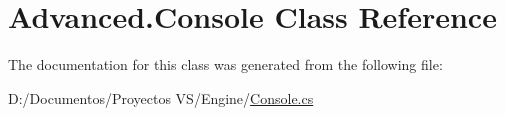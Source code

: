 \hypertarget{class_advanced_1_1_console}{}\section{Advanced.\+Console Class Reference}
\label{class_advanced_1_1_console}


The documentation for this class was generated from the following file\+:\begin{DoxyCompactItemize}
\item 
D\+:/\+Documentos/\+Proyectos V\+S/\+Engine/\mbox{\hyperlink{_console_8cs}{Console.\+cs}}\end{DoxyCompactItemize}
